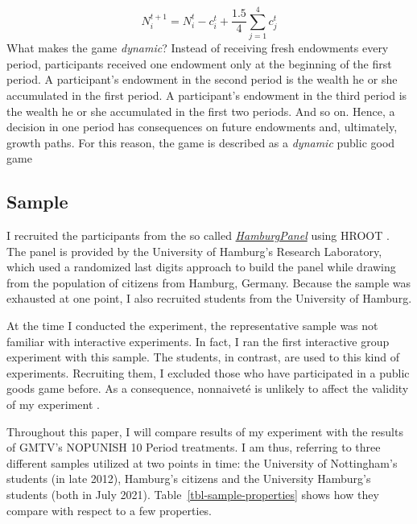 \documentclass[
  authoryear,
  preprint,
  3p]{elsarticle}
\begin{document}
\[
N_i^{t+1}=N_i^t - c_i^t + \frac{1.5}{4}\sum_{j=1}^4 c_j^t
\] What makes the game \emph{dynamic}? Instead of receiving fresh
endowments every period, participants received one endowment only at the
beginning of the first period. A participant's endowment in the second
period is the wealth he or she accumulated in the first period. A
participant's endowment in the third period is the wealth he or she
accumulated in the first two periods. And so on. Hence, a decision in
one period has consequences on future endowments and, ultimately, growth
paths. For this reason, the game is described as a \emph{dynamic} public
good game

\hypertarget{sec-sample}{%
\subsection{Sample}\label{sec-sample}}

I recruited the participants from the so called
\emph{\href{https://www.wiso.uni-hamburg.de/forschung/forschungslabor/umfragelabor/aktuelle-umfragen/hamburgpanel.html}{HamburgPanel}}
using HROOT \citep{hroot}. The panel is provided by the University of
Hamburg's Research Laboratory, which used a randomized last digits
approach to build the panel while drawing from the population of
citizens from Hamburg, Germany. Because the sample was exhausted at one
point, I also recruited students from the University of Hamburg.

At the time I conducted the experiment, the representative sample was
not familiar with interactive experiments. In fact, I ran the first
interactive group experiment with this sample. The students, in
contrast, are used to this kind of experiments. Recruiting them, I
excluded those who have participated in a public goods game before. As a
consequence, nonnaiveté is unlikely to affect the validity of my
experiment \citep[ p.~204]{GoodmanPaolacci2017}.

Throughout this paper, I will compare results of my experiment with the
results of GMTV's NOPUNISH 10 Period treatments. I am thus, referring to
three different samples utilized at two points in time: the University
of Nottingham's students (in late 2012), Hamburg's citizens and the
University Hamburg's students (both in July 2021).
Table~\ref{tbl-sample-properties} shows how they compare with respect to
a few properties.
\end{document}
